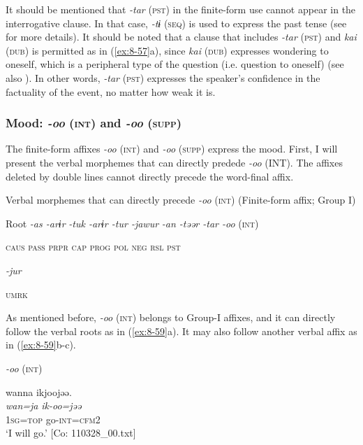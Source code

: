   It should be mentioned that \textit{-tar} (\textsc{pst}) in the finite-form use cannot appear in the interrogative clause. In that case, \textit{-tɨ} (\textsc{seq}) is used to express the past tense (see  for more details). It should be noted that a clause that includes \textit{-tar} (\textsc{pst}) and \textit{kai} (\textsc{dub}) is permitted as in (\ref{ex:8-57}a), since \textit{kai} (\textsc{dub}) expresses wondering to oneself, which is a peripheral type of the question (i.e. question to oneself) (see also ). In other words, \textit{-tar} (\textsc{pst}) expresses the speaker’s confidence in the factuality of the event, no matter how weak it is.

\subsubsection{Mood: \textit{-oo} (\textsc{int}) and \textit{-oo} (\textsc{supp})}

The finite-form affixes \textit{-oo} (\textsc{int}) and \textit{-oo} (\textsc{supp}) express the mood. First, I will present the verbal morphemes that can directly predede \textit{-oo} (INT). The affixes deleted by double lines cannot directly precede the word-final affix.

\ea\label{ex:8-58}
  Verbal morphemes that can directly precede \textit{-oo} (\textsc{int}) (Finite-form affix; Group I)

  Root  \textit{-as  -arɨr} %
\textit{-tuk  -arɨr  -tur  -jawur} %
\textit{-an  -təər  -tar  -oo} (\textsc{int})

    \textsc{caus}  \textsc{pass}  \textsc{prpr}  \textsc{cap}  \textsc{prog}  \textsc{pol}  \textsc{neg}  \textsc{rsl}  \textsc{pst}

          \textit{-jur}

          \textsc{umrk}
\z

As mentioned before, \textit{-oo} (\textsc{int}) belongs to Group-I affixes, and it can directly follow the verbal roots as in (\ref{ex:8-59}a). It may also follow another verbal affix as in (\ref{ex:8-59}b-c).

\ea\label{ex:8-59}
  \textit{-oo} (\textsc{int})

\ea
{\US}
\glll   wanna  ikjoojəə.\\
\textit{wan=ja}  \textit{ik-oo=jəə}\\
1\textsc{sg}=\textsc{top}  go-\textsc{int}=\textsc{cfm2}\\
\glt ‘I will go.’ [Co: 110328\_00.txt]

